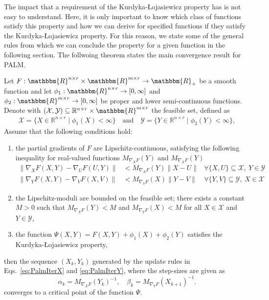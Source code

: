 The impact that a requirement of the Kurdyka-{\L}ojasiewicz property has is not easy to understand. Here, it is only important to know which class of functions satisfy this property and how we can derive for specified functions if they satisfy the Kurdyka-{\L}ojasiewicz property. For this reason, we state some of the general rules from which we can conclude the \KL property for a given function in the following section. The follwoing theorem states the main convergence result for PALM.

\begin{theorem}{{\citep{bolte2014proximal}}}\label{thm:palmConv}
Let $F:\mathbbm{R}^{n\times r}\times \mathbbm{R}^{m\times r}\rightarrow \mathbbm{R}_+$ be a smooth function and let $\phi_1:\mathbbm{R}^{n\times r}\rightarrow [0,\infty]$ and $\phi_2:\mathbbm{R}^{m\times r}\rightarrow [0,\infty]$ be proper and lower semi-continuous functions. Denote with $(\mathcal{X},\mathcal{Y})\subseteq\mathbb{R}^{n\times r}\times \mathbbm{R}^{m\times r}$ the feasible set, defined as
\begin{align*}
    \mathcal{X} = \{X\in \mathbb{R}^{n\times r}\mid \phi_1(X)<\infty\}\quad \text{and} \quad \mathcal{Y} = \{Y\in \mathbb{R}^{n\times r}\mid \phi_2(Y)<\infty\},
\end{align*}
Assume that the following conditions hold:
\begin{enumerate}
\item the partial gradients of $F$ are Lipschitz-continuous, satisfying the following inequality for real-valued functions $M_{\nabla_XF}(Y)$ and $M_{\nabla_XF}(Y)$
\begin{align*}
\|\nabla_XF(X,Y)-\nabla_UF(U,Y)\|&< M_{\nabla_XF}(Y)\|X-U\| &\forall \{X,U\} \subseteq \mathcal{X},\ Y\in\mathcal{Y}\\
\|\nabla_YF(X,Y)-\nabla_VF(X,V)\|&< M_{\nabla_YF}(X)\|Y-V\| &\forall \{Y,V\} \subseteq \mathcal{Y},\ X\in\mathcal{X}
\end{align*}
\item the Lipschitz-moduli are bounded on the feasible set; there exists a constant $M>0$ such that $M_{\nabla_XF}(Y)<M$ and $M_{\nabla_YF}(X)<M$ for all $X\in\mathcal{X}$ and $Y\in\mathcal{Y}$,
\item the function $\Psi(X,Y)=F(X,Y)+\phi_1(X)+\phi_2(Y)$ satisfies the Kurdyka-{\L}ojasiewicz property,
\end{enumerate}
then the sequence $(X_k,Y_k)$ generated by the update rules in Eqs.~\eqref{eq:PalmIterX} and \eqref{eq:PalmIterY}, where the step-sizes are given as
\[\alpha_k=M_{\nabla_XF}(Y_k)^{-1}, \quad \beta_k= M_{\nabla_YF}(X_{k+1})^{-1}.\]
converges to a critical point of the function $\Psi$. 
\end{theorem}
